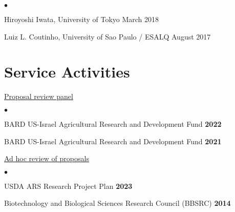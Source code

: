 \documentclass[margin,line,10pt]{res}
\newenvironment{list2}{
  \begin{list}{$\bullet$}{%
      \setlength{\itemsep}{0in}
      \setlength{\parsep}{0in} \setlength{\parskip}{0in}
      \setlength{\topsep}{0in} \setlength{\partopsep}{0in} 
      \setlength{\leftmargin}{0.2in}}}{\end{list}}
\begin{document}
\begin{resume}
\begin{list2}
\item Hiroyoshi Iwata, University of Tokyo  \hfill March 2018\\
    
\item Luiz L. Coutinho, University of Sao Paulo / ESALQ  \hfill August 2017\\


\end{list2}












\vspace{0.5cm}
\section{\sc Service Activities}


\begin{flushleft}
  \hspace{0.3cm} \underline{Proposal review panel}
  \end{flushleft}


  \begin{list2}
    \item BARD US-Israel Agricultural Research and Development Fund \hfill \textbf{2022}  \\
  
    \vspace{0.3cm}

    \item BARD US-Israel Agricultural Research and Development Fund \hfill \textbf{2021}  \\
  
    \end{list2}



\begin{flushleft}
\hspace{0.3cm} \underline{Ad hoc review of proposals}
\end{flushleft}

\begin{list2}

  \item USDA ARS Research Project Plan \hfill \textbf{2023}  \\

  \vspace{0.3cm}

\item  Biotechnology and Biological Sciences Research Council (BBSRC) \hfill \textbf{2014}  \\
\end{list2}



\end{resume}
\end{document}

